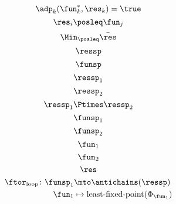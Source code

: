 {\begin{forslides}
\begin{equation}
        \label{eq:opt_4}
        \adp_k(\fun_k^*,\res_k)=\true
    \end{equation}
    \begin{equation}
        \label{eq:opt_5}
        \res_i\posleq \fun_j
    \end{equation}
    \begin{equation}
        \label{eq:opt_6}
        \Min_{\posleq}\bar{\res}
    \end{equation}
    \begin{equation}
        \label{eq:genfun_1}
        \ressp
    \end{equation}
    \begin{equation}
        \label{eq:genfun_2}
        \funsp
    \end{equation}
    \begin{equation}
        \label{eq:genfun_3}
        \ressp_1
    \end{equation}
    \begin{equation}
        \label{eq:genfun_3_1}
        \ressp_2
    \end{equation}
    \begin{equation}
        \label{eq:genfun_3_2}
        \ressp_1\Ptimes \ressp_2
    \end{equation}
    \begin{equation}
        \label{eq:genfun_4}
        \funsp_1
    \end{equation}
    \begin{equation}
        \label{eq:genfun_5}
        \funsp_2
    \end{equation}
    \begin{equation}
        \label{eq:genfun_6}
        \fun_1
    \end{equation}
    \begin{equation}
        \label{eq:genfun_7}
        \fun_2
    \end{equation}
    \begin{equation}
        \label{eq:genfun_8}
        \res
    \end{equation}
    \begin{equation}
        \label{eq:genfun_9}
        \begin{aligned}
            \ftor_\mathrm{loop}\colon \funsp_1 & \mto \antichains(\ressp) \\
            \fun_1                             & \mapsto \text{least-fixed-point}(\Phi_{\fun_1})
        \end{aligned}
    \end{equation}

\end{forslides}}
